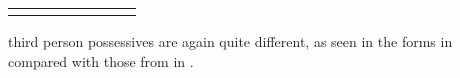 \documentclass[output=paper]{langsci/langscibook}
\begin{document}
\begin{table}
\begin{tabularx}{\textwidth}{lllXXlll}
\lspbottomrule
\end{tabularx}
\end{table}

  
 third person possessives are again quite different, as seen in the forms in  compared with those from  in .
\end{document}
